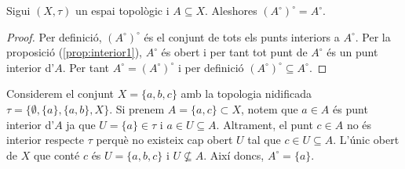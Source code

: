 \documentclass[../main.tex]{subfiles}
\begin{document}
\begin{prop}
\label{prop:interior3} Sigui $(X,\tau)$ un espai topològic i $A\subseteq X$. Aleshores $(A^\circ)^\circ = A^\circ$.
\end{prop}
\begin{proof}
Per definició, $(A^\circ)^\circ$ és el conjunt de tots els punts interiors a $A^\circ$. Per la proposició (\ref{prop:interior1}), $A^\circ$ és obert i per tant tot punt de $A^\circ$ és un punt interior d'$A$. Per tant $A^\circ = (A^\circ)^\circ$ i per definició $(A^\circ)^\circ \subseteq A^\circ$.
\end{proof}

\begin{ej}
\label{ej:interior1} Considerem el conjunt $X = \{a,b,c\}$ amb la topologia nidificada $\tau = \{\emptyset,\{a\},\{a,b\},X\}$. Si prenem $A = \{a,c\}\subset X$, notem que $a\in A$ és punt interior d'$A$ ja que $U = \{a\}\in\tau$ i $a\in U\subseteq A$. Altrament, el punt $c\in A$ no és interior respecte $\tau$ perquè no existeix cap obert $U$ tal que $c\in U\subseteq A$. L'únic obert de $X$ que conté $c$ és $U = \{a,b,c\}$ i $U\not\subseteq A$. Així doncs, $A^\circ = \{a\}$.
\end{ej}
\end{document}
